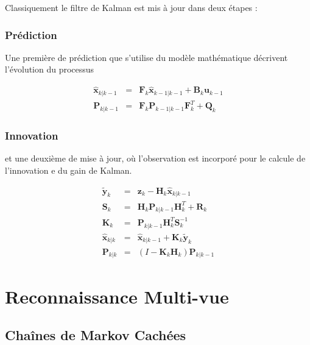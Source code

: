 Classiquement le filtre de Kalman est mis à jour dans deux étapes : 

\subsubsection{Prédiction} Une première de prédiction que s'utilise du modèle mathématique décrivent l'évolution du processus 

\begin{equation*}
	\begin{array}{ccl}
		\hat{\textbf{x}}_{k|k-1} &=& \textbf{F}_{k}\hat{\textbf{x}}_{k-1|k-1} + \textbf{B}_{k} \textbf{u}_{k-1}\\
		\textbf{P}_{k|k-1} &=& \textbf{F}_{k} \textbf{P}_{k-1|k-1} \textbf{F}_{k}^{T} + \textbf{Q}_{k}
	\end{array}
\end{equation*}

\subsubsection{Innovation}
et une deuxième de mise à jour, où l'observation est incorporé pour le calcule de l'innovation e du gain de Kalman.

\begin{equation*}
	\begin{array}{ccl}
\tilde{\textbf{y}}_{k} &=& \textbf{z}_{k} - \textbf{H}_{k}\hat{\textbf{x}}_{k|k-1} \\
\textbf{S}_{k} &=& \textbf{H}_{k}\textbf{P}_{k|k-1} \textbf{H}_{k}^{T}+\textbf{R}_{k} \\
\textbf{K}_{k} &=& \textbf{P}_{k|k-1}\textbf{H}_{k}^{T}\textbf{S}_{k}^{-1} \\
\hat{\textbf{x}}_{k|k} &=& \hat{\textbf{x}}_{k|k-1} + \textbf{K}_{k}\tilde{\textbf{y}}_{k} \\
\textbf{P}_{k|k} &=& (I - \textbf{K}_{k} \textbf{H}_{k}) \textbf{P}_{k|k-1}
	\end{array}
\end{equation*}

\section {Reconnaissance Multi-vue}

\subsection {Chaînes de Markov Cachées}

